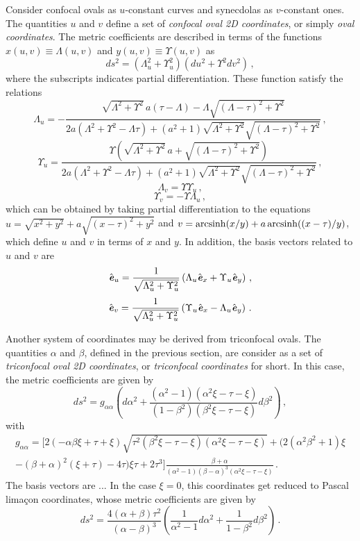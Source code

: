 \documentclass[12pt, ams, nofootinbib]{revtex4}
\def\be{\begin{equation}}
\def\ee{\end{equation}}
\def\arcsinh{{\rm arcsinh}}
\def\X{\Lambda}
\def\Y{\Upsilon}
\def\ehat{\hat{\text{\textbf{\textit{e}}}}}
\newcommand{\rob}[1]{\left(#1\right)}    %
\theoremstyle{definition}
\begin{document}
Consider confocal ovals as $u$-constant curves and synecdolas as $v$-constant ones. The quantities $u$ and $v$ define a set of \textit{confocal oval 2D coordinates}, or simply \textit{oval coordinates}. The metric coefficients are described in terms of the functions $x(u,v)\equiv \X(u,v)$ and $y(u,v)\equiv\Y(u,v)$ as
\be
	 ds^2 = \rob{\X_u^2+\Y_u^2}(du^2 + \Y^2 dv^2)\,,
\ee
where the subscripts indicates partial differentiation. These function satisfy the relations
\be	
	\X_{u} = 
-\frac{\sqrt{\X^{2}+\Y^{2}}\,a \left(\tau -\X \right) -\X  \sqrt{(\X-\tau)^2 + \Y^2}}{2 a \left(\X^{2}+\Y^{2}-\X\tau\right)+ \left(a^{2}+1\right) \sqrt{\X^{2}+\Y^{2}} \sqrt{(\X-\tau)^2 + \Y^2} } \,, \label{eq:diff1}
\ee
\be	
	\Y_{u} = 
\frac{\Y \left(\sqrt{\X^{2}+\Y^{2}}\, a +\sqrt{(\X-\tau)^2 + \Y^2}\right)}{2 a \left(\X^{2}+\Y^{2}-\X\tau\right)+ \left(a^{2}+1\right) \sqrt{\X^{2}+\Y^{2}} \sqrt{(\X-\tau)^2 + \Y^2} } \,,\label{eq:diff2}
\ee
\be 
	\X_v = \Y\Y_u\,, \label{eq:diff3}
\ee
\be
	\Y_v = -\Y\X_u\,,  \label{eq:diff4}
\ee
which can be obtained by taking partial differentiation to the equations $u=\sqrt{x^2+y^2}+a\sqrt{(x-\tau)^2+y^2}$ and $v=\arcsinh(x/y)+a\,\arcsinh((x-\tau)/y)$, which define $u$ and $v$ in terms of $x$ and $y$. In addition, the basis vectors related to $u$ and $v$ are
\be
	\ehat_u = \frac{1}{\sqrt{\X_u^2 + \Y_u^2}}\rob{\X_u\ehat_x + \Y_u\ehat_y }\,,
\ee
\be
	\ehat_v = \frac{1}{\sqrt{\X_u^2 + \Y_u^2}}\rob{\Y_u\ehat_x-\X_u\ehat_y}\,.
\ee

Another system of coordinates may be derived from triconfocal ovals. The quantities $\alpha$ and $\beta$, defined in the previous section, are consider as a set of \textit{triconfocal oval 2D coordinates}, or \textit{triconfocal coordinates} for short. In this case, the metric coefficients are given by
\be
	ds^2 = g_{\alpha\alpha}\rob{d\alpha^2+\frac{(\alpha^2-1)(\alpha^2\xi-\tau-\xi)}{(1-\beta^2)(\beta^2\xi-\tau-\xi)} d\beta^2}\,,
\ee
with
\begin{multline}
	g_{\alpha\alpha} = \Big[2 \rob{-\alpha  \beta  \xi +\tau +\xi } \sqrt{\tau^{2} \rob{\beta^{2} \xi -\tau -\xi } \rob{\alpha^{2} \xi -\tau -\xi }}+ \big(2\rob{\alpha^{2} \beta^{2}+1} \xi \\
	 -\rob{\beta +\alpha }^{2} \rob{\xi +\tau }-4 \tau \big) \xi  \tau +2 \tau^{3}\Big] \frac{\beta +\alpha}{\rob{\alpha^{2}-1} \rob{\beta -\alpha }^{3} \rob{\alpha^{2} \xi -\tau -\xi }}\,.
\end{multline}
The basis vectors are ... In the case $\xi=0$, this coordinates get reduced to Pascal limaçon coordinates, whose metric coefficients are given by  %
\be
	ds^2=\frac{4(\alpha+\beta)\tau^2}{(\alpha-\beta)^3}\rob{\frac{1}{\alpha^2-1}d\alpha^2+\frac{1}{1-\beta^2}d\beta^2}\,.
\ee
\end{document}
